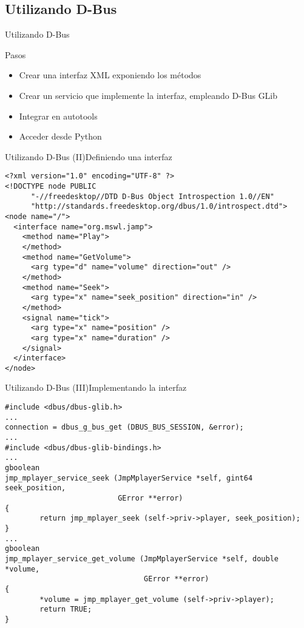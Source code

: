 \documentclass{beamer}
\begin{document}
\subsection{Utilizando D-Bus}

\begin{frame}{Utilizando D-Bus}
\begin{block}{Pasos}
\begin{itemize}
  \item Crear una interfaz XML exponiendo los métodos
  \item Crear un servicio que implemente la interfaz, empleando D-Bus GLib
  \item Integrar en autotools
  \item Acceder desde Python
\end{itemize}
\end{block}
\end{frame}

\begin{frame}[fragile]{Utilizando D-Bus (II)}{Definiendo una interfaz}
\tiny{
\begin{verbatim}
<?xml version="1.0" encoding="UTF-8" ?>
<!DOCTYPE node PUBLIC
	  "-//freedesktop//DTD D-Bus Object Introspection 1.0//EN"
	  "http://standards.freedesktop.org/dbus/1.0/introspect.dtd">
<node name="/">
  <interface name="org.mswl.jamp">
    <method name="Play">
    </method>
    <method name="GetVolume">
      <arg type="d" name="volume" direction="out" />
    </method>
    <method name="Seek">
      <arg type="x" name="seek_position" direction="in" />
    </method>
    <signal name="tick">
      <arg type="x" name="position" />
      <arg type="x" name="duration" />
    </signal>
  </interface>
</node>
\end{verbatim}
}
\end{frame}

\begin{frame}[fragile]{Utilizando D-Bus (III)}{Implementando la interfaz}
\tiny{
\begin{verbatim}
#include <dbus/dbus-glib.h>
...
connection = dbus_g_bus_get (DBUS_BUS_SESSION, &error);
...
#include <dbus/dbus-glib-bindings.h>
...
gboolean
jmp_mplayer_service_seek (JmpMplayerService *self, gint64 seek_position,
                          GError **error)
{
        return jmp_mplayer_seek (self->priv->player, seek_position);
}
...
gboolean
jmp_mplayer_service_get_volume (JmpMplayerService *self, double *volume,
                                GError **error)
{
        *volume = jmp_mplayer_get_volume (self->priv->player);
        return TRUE;
}
\end{verbatim}
}
\end{frame}
\end{document}
